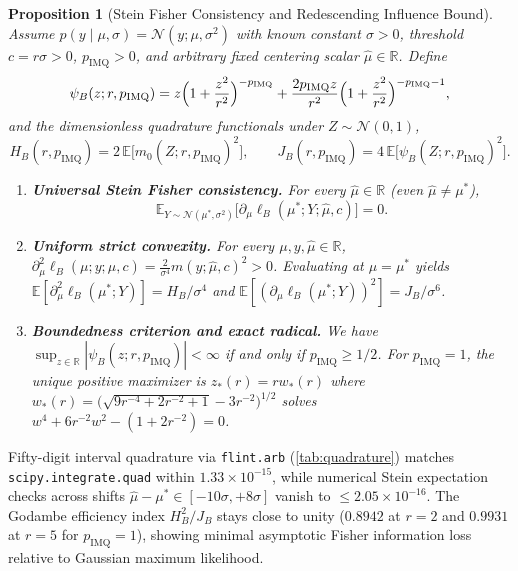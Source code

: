 \documentclass[11pt,a4paper,reqno]{amsart}
\newtheorem{proposition}[theorem]{Proposition}
\theoremstyle{definition}
\theoremstyle{remark}
\newcommand{\R}{\mathbb{R}}
\newcommand{\E}{\mathbb{E}}
\newcommand{\Ncal}{\mathcal{N}}
\begin{document}
\begin{proposition}[Stein Fisher Consistency and Redescending Influence Bound]\label{prop:stein_fisher}
Assume $p(y \mid \mu, \sigma) = \Ncal(y; \mu, \sigma^2)$ with known constant $\sigma > 0$, threshold $c = r\sigma > 0$, $p_{\mathrm{IMQ}} > 0$, and arbitrary fixed centering scalar $\hat{\mu} \in \R$. Define
\[
\psi_B(z; r, p_{\mathrm{IMQ}}) = z\Bigl(1 + \frac{z^2}{r^2}\Bigr)^{-p_{\mathrm{IMQ}}} + \frac{2 p_{\mathrm{IMQ}} z}{r^2}\Bigl(1 + \frac{z^2}{r^2}\Bigr)^{-p_{\mathrm{IMQ}}-1},
\]
and the dimensionless quadrature functionals under $Z \sim \Ncal(0, 1)$,
\[
H_B(r, p_{\mathrm{IMQ}}) = 2\,\E\bigl[m_0(Z; r, p_{\mathrm{IMQ}})^2\bigr], \qquad
J_B(r, p_{\mathrm{IMQ}}) = 4\,\E\bigl[\psi_B(Z; r, p_{\mathrm{IMQ}})^2\bigr].
\]
\begin{enumerate}[label=(\alph*)]
\item \textbf{Universal Stein Fisher consistency.} For every $\hat{\mu} \in \R$ (even $\hat{\mu} \neq \mu^*$),
\[
\E_{Y \sim \Ncal(\mu^*, \sigma^2)}\bigl[\partial_\mu \ell_B(\mu^*; Y; \hat{\mu}, c)\bigr] = 0.
\]
\item \textbf{Uniform strict convexity.} For every $\mu, y, \hat{\mu} \in \R$, $\partial_\mu^2 \ell_B(\mu; y; \hat{\mu}, c) = \frac{2}{\sigma^4} m(y; \hat{\mu}, c)^2 > 0$. Evaluating at $\hat{\mu} = \mu^*$ yields $\E[\partial_\mu^2 \ell_B(\mu^*; Y)] = H_B / \sigma^4$ and $\E[(\partial_\mu \ell_B(\mu^*; Y))^2] = J_B / \sigma^6$.
\item \textbf{Boundedness criterion and exact radical.} We have $\sup_{z \in \R} |\psi_B(z; r, p_{\mathrm{IMQ}})| < \infty$ if and only if $p_{\mathrm{IMQ}} \ge 1/2$. For $p_{\mathrm{IMQ}} = 1$, the unique positive maximizer is $z_*(r) = r w_*(r)$ where $w_*(r) = \bigl(\sqrt{9r^{-4} + 2r^{-2} + 1} - 3r^{-2}\bigr)^{1/2}$ solves $w^4 + 6r^{-2}w^2 - (1 + 2r^{-2}) = 0$.
\end{enumerate}
\end{proposition}

Fifty-digit interval quadrature via \texttt{flint.arb} (\cref{tab:quadrature}) matches \texttt{scipy.integrate.quad} within $1.33 \times 10^{-15}$, while numerical Stein expectation checks across shifts $\hat{\mu} - \mu^* \in [-10\sigma, +8\sigma]$ vanish to $\le 2.05 \times 10^{-16}$. The Godambe efficiency index $H_B^2 / J_B$ stays close to unity ($0.8942$ at $r=2$ and $0.9931$ at $r=5$ for $p_{\mathrm{IMQ}}=1$), showing minimal asymptotic Fisher information loss relative to Gaussian maximum likelihood.
\end{document}
